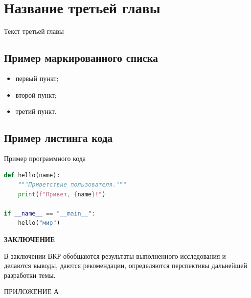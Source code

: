 \documentclass[a4paper,14pt]{extarticle}
\begin{document}
\newpage

\section{Название третьей главы}

Текст третьей главы

\subsection{Пример маркированного списка}

\begin{itemize}
  \item первый пункт;
  \item второй пункт;
  \item третий пункт.
\end{itemize}

\subsection{Пример листинга кода}

Пример программного кода

\begin{lstlisting}[language=Python, caption={Пример функции на Python}]
def hello(name):
    """Приветствие пользователя."""
    print(f"Привет, {name}!")

if __name__ == "__main__":
    hello("мир")
\end{lstlisting}

\newpage

\begin{center}
\textbf{ЗАКЛЮЧЕНИЕ}
\end{center}

В заключении ВКР обобщаются результаты выполненного исследования и делаются выводы, даются рекомендации, определяются перспективы дальнейшей разработки темы.

\newpage

{}

\nocite{*}


\newpage

\begin{center}
ПРИЛОЖЕНИЕ А
\end{center}
\label{app:a}
\end{document}
